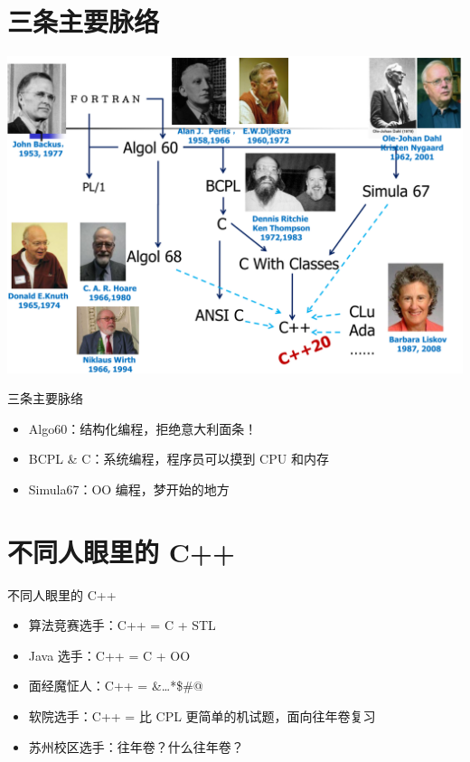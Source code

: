 \documentclass[10pt,aspectratio=169,mathserif]{beamer}
\begin{document}
\section{三条主要脉络}
\begin{frame}
    \begin{center}
        \includegraphics[height=\textheight]{image/c++_history.png}
    \end{center}
\end{frame}

\begin{frame}{三条主要脉络}
    \begin{itemize}
        \item
              Algo60：结构化编程，拒绝意大利面条！
        \item
              BCPL \& C：系统编程，程序员可以摸到 CPU 和内存
        \item
              Simula67：OO 编程，梦开始的地方
    \end{itemize}
\end{frame}



\section{不同人眼里的 C++}

\begin{frame}{不同人眼里的 C++}

    \begin{itemize}
        \item
              算法竞赛选手：C++ = C + STL
        \item
              Java 选手：C++ = C + OO
        \item
              面经魔怔人：C++ = \&\ldots{}*\$\#@
        \item
              软院选手：C++ = 比 CPL 更简单的机试题，面向往年卷复习
        \item
              苏州校区选手：往年卷？什么往年卷？
    \end{itemize}

\end{frame}
\end{document}
